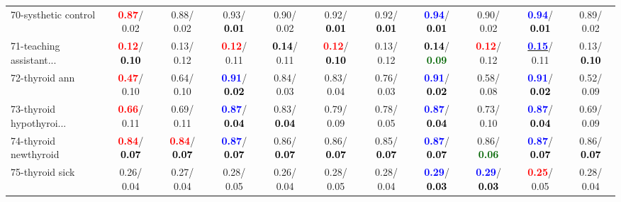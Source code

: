 \begin{table}[h]
\begin{center}
{\begin{tabular}{lc|c|c|c|c|c|c|c|c|c}
70-systhetic control & \textcolor{red}{\textbf{  0.87}}/  0.02 &   0.88/  0.02 &   0.93/\textcolor{black}{\textbf{  0.01}} &   0.90/  0.02 &   0.92/\textcolor{black}{\textbf{  0.01}} &   0.92/\textcolor{black}{\textbf{  0.01}} & \textcolor{blue}{\textbf{  0.94}}/\textcolor{black}{\textbf{  0.01}} &   0.90/  0.02 & \textcolor{blue}{\textbf{  0.94}}/\textcolor{black}{\textbf{  0.01}} &   0.89/  0.02 \\
71-teaching assistant... & \textcolor{red}{\textbf{  0.12}}/\textcolor{black}{\textbf{  0.10}} &   0.13/  0.12 & \textcolor{red}{\textbf{  0.12}}/  0.11 & \textcolor{black}{\textbf{  0.14}}/  0.11 & \textcolor{red}{\textbf{  0.12}}/\textcolor{black}{\textbf{  0.10}} &   0.13/  0.12 & \textcolor{black}{\textbf{  0.14}}/\textcolor{darkgreen}{\textbf{  0.09}} & \textcolor{red}{\textbf{  0.12}}/  0.12 & \underline{\textcolor{blue}{\textbf{  0.15}}}/  0.11 &   0.13/\textcolor{black}{\textbf{  0.10}} \\ \hline
72-thyroid ann & \textcolor{red}{\textbf{  0.47}}/  0.10 &   0.64/  0.10 & \textcolor{blue}{\textbf{  0.91}}/\textcolor{black}{\textbf{  0.02}} &   0.84/  0.03 &   0.83/  0.04 &   0.76/  0.03 & \textcolor{blue}{\textbf{  0.91}}/\textcolor{black}{\textbf{  0.02}} &   0.58/  0.08 & \textcolor{blue}{\textbf{  0.91}}/\textcolor{black}{\textbf{  0.02}} &   0.52/  0.09 \\
73-thyroid hypothyroi... & \textcolor{red}{\textbf{  0.66}}/  0.11 &   0.69/  0.11 & \textcolor{blue}{\textbf{  0.87}}/\textcolor{black}{\textbf{  0.04}} &   0.83/\textcolor{black}{\textbf{  0.04}} &   0.79/  0.09 &   0.78/  0.05 & \textcolor{blue}{\textbf{  0.87}}/\textcolor{black}{\textbf{  0.04}} &   0.73/  0.10 & \textcolor{blue}{\textbf{  0.87}}/\textcolor{black}{\textbf{  0.04}} &   0.69/  0.09 \\
74-thyroid newthyroid & \textcolor{red}{\textbf{  0.84}}/\textcolor{black}{\textbf{  0.07}} & \textcolor{red}{\textbf{  0.84}}/\textcolor{black}{\textbf{  0.07}} & \textcolor{blue}{\textbf{  0.87}}/\textcolor{black}{\textbf{  0.07}} &   0.86/\textcolor{black}{\textbf{  0.07}} &   0.86/\textcolor{black}{\textbf{  0.07}} &   0.85/\textcolor{black}{\textbf{  0.07}} & \textcolor{blue}{\textbf{  0.87}}/\textcolor{black}{\textbf{  0.07}} &   0.86/\textcolor{darkgreen}{\textbf{  0.06}} & \textcolor{blue}{\textbf{  0.87}}/\textcolor{black}{\textbf{  0.07}} &   0.86/\textcolor{black}{\textbf{  0.07}} \\
75-thyroid sick &   0.26/  0.04 &   0.27/  0.04 &   0.28/  0.05 &   0.26/  0.04 &   0.28/  0.05 &   0.28/  0.04 & \textcolor{blue}{\textbf{  0.29}}/\textcolor{black}{\textbf{  0.03}} & \textcolor{blue}{\textbf{  0.29}}/\textcolor{black}{\textbf{  0.03}} & \textcolor{red}{\textbf{  0.25}}/  0.05 &   0.28/  0.04 \\

\end{tabular}}
\end{center}
\end{table}
